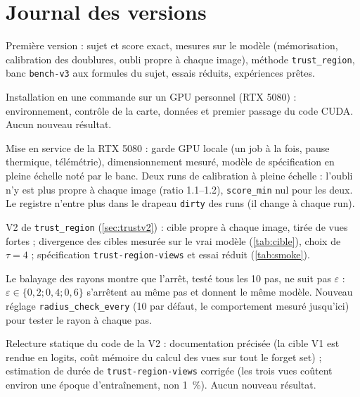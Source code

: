 \documentclass[11pt,a4paper]{article}
\newcommand{\code}[1]{\texttt{#1}}
\begin{document}
\section*{Journal des versions}
\begin{description}[leftmargin=1.2em,font=\sffamily\bfseries\color{bleu}]
  \item[21 novembre 2026] Première version : sujet et score exact, mesures sur le modèle
    (mémorisation, calibration des doublures, oubli propre à chaque image), méthode
    \code{trust\_region}, banc \code{bench-v3} aux formules du sujet, essais réduits, expériences
    prêtes.
  \item[21 novembre 2026, soir] Installation en une commande sur un GPU personnel (RTX 5080) :
    environnement, contrôle de la carte, données et premier passage du code CUDA. Aucun nouveau
    résultat.
  \item[21 novembre 2026, nuit] Mise en service de la RTX 5080 : garde GPU locale (un job à la fois,
    pause thermique, télémétrie), dimensionnement mesuré, modèle de spécification en pleine
    échelle noté par le banc. Deux runs de calibration à pleine échelle : l'oubli n'y est plus
    propre à chaque image (ratio \numrange{1.1}{1.2}), \code{score\_min} nul pour les deux. Le
    registre n'entre plus dans le drapeau \code{dirty} des runs (il change à chaque run).
  \item[21 novembre 2026, nuit, V2] V2 de \code{trust\_region} (\cref{sec:trustv2}) : cible propre à
    chaque image, tirée de vues fortes ; divergence des cibles mesurée sur le vrai modèle
    (\cref{tab:cible}), choix de $\tau=4$ ; spécification \code{trust-region-views} et essai
    réduit (\cref{tab:smoke}).
  \item[21 novembre 2026, nuit, suite] Le balayage des rayons montre que l'arrêt, testé tous les
    10 pas, ne suit pas $\varepsilon$ : $\varepsilon\in\{0{,}2;0{,}4;0{,}6\}$ s'arrêtent au même
    pas et donnent le même modèle. Nouveau réglage \code{radius\_check\_every} (10 par défaut, le
    comportement mesuré jusqu'ici) pour tester le rayon à chaque pas.
  \item[21 novembre 2026, nuit, relecture V2] Relecture statique du code de la V2 : documentation
    précisée (la cible V1 est rendue en logits, coût mémoire du calcul des vues sur tout le
    forget set) ; estimation de durée de \code{trust-region-views} corrigée (les trois vues coûtent
    environ une époque d'entraînement, non \SI{1}{\percent}). Aucun nouveau résultat.

\end{description}
\end{document}
